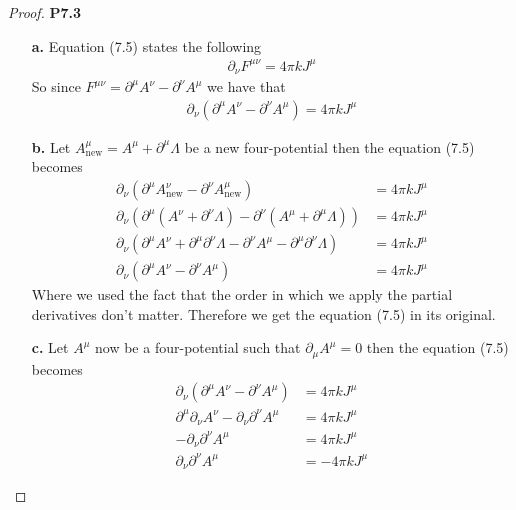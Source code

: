 \documentclass[11pt]{article}
\theoremstyle{definition}
\begin{document}
\cleardoublepage
\begin{proof}{\textbf{P7.3}}
\begin{itemize}
    \item [\textbf{a.}] Equation (7.5) states the following
    \begin{align*}
        \partial_\nu F^{\mu\nu} = 4\pi k J^\mu
    \end{align*}
    So since $F^{\mu\nu} = \partial^\mu A^\nu - \partial^\nu A^\mu$ we have
    that
    \begin{align*}
        \partial_\nu (\partial^\mu A^\nu - \partial^\nu A^\mu) = 4\pi k J^\mu
    \end{align*}

    \item [\textbf{b.}] Let $A^\mu_{\text{new}} = A^\mu + \partial^\mu\Lambda$
    be a new four-potential then the equation (7.5) becomes
    \begin{align*}
        \partial_\nu (\partial^\mu A^\nu_{\text{new}} - \partial^\nu A^\mu_{\text{new}})
        &= 4\pi k J^\mu\\
        \partial_\nu (\partial^\mu (A^\nu + \partial^\nu\Lambda)
         - \partial^\nu (A^\mu + \partial^\mu \Lambda))
        &= 4\pi k J^\mu\\
        \partial_\nu (\partial^\mu A^\nu + \partial^\mu\partial^\nu\Lambda
         - \partial^\nu A^\mu - \partial^\mu\partial^\nu \Lambda)
        &= 4\pi k J^\mu\\
        \partial_\nu (\partial^\mu A^\nu - \partial^\nu A^\mu)
        &= 4\pi k J^\mu
    \end{align*}
    Where we used the fact that the order in which we apply the partial
    derivatives don't matter.
    Therefore we get the equation (7.5) in its original.

    \item [\textbf{c.}] Let $A^\mu$ now be a four-potential such that
    $\partial_\mu A^\mu = 0$ then the equation (7.5) becomes
    \begin{align*}
        \partial_\nu (\partial^\mu A^\nu - \partial^\nu A^\mu) &= 4\pi k J^\mu\\
        \partial^\mu \partial_\nu A^\nu - \partial_\nu \partial^\nu A^\mu &= 4\pi k J^\mu\\
        - \partial_\nu \partial^\nu A^\mu &= 4\pi k J^\mu\\
        \partial_\nu \partial^\nu A^\mu &= -4\pi k J^\mu
    \end{align*}
\end{itemize}
\end{proof}
\end{document}
